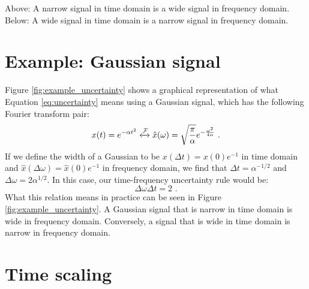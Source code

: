 \begin{marginfigure}
\begin{center}

\end{center}
\caption{Above: A narrow signal in time domain is a wide signal in frequency domain. 
Below: A wide signal in time domain is a narrow signal in frequency domain.}
\label{fig:example_uncertainty}
\end{marginfigure}

\section{Example: Gaussian signal}
Figure \ref{fig:example_uncertainty} shows a graphical representation
of what Equation \ref{eq:uncertainty} means using a Gaussian signal, which has the following Fourier transform pair:
\begin{equation}
x(t) = e^{-\alpha t^2} \xleftrightarrow{\mathcal{F}} \hat{x}(\omega) = \sqrt{\frac{\pi}{\alpha}} e^{-\frac{\omega^2}{4\alpha}} \,\,.
\end{equation}
If we define the width of a Gaussian to be $x(\Delta t)=x(0)e^{-1}$ in
time domain and $\hat{x}(\Delta \omega)=\hat{x}(0)e^{-1}$ in frequency
domain, we find that $\Delta t = \alpha^{-1/2}$ and $\Delta \omega
= 2\alpha^{1/2}$. In this case, our time-frequency uncertainty rule would be:
\begin{equation}
\Delta \omega \Delta t  = 2 \,\,.
\end{equation}
What this relation means in practice can be seen in
Figure \ref{fig:example_uncertainty}. A Gaussian signal that is narrow
in time domain is wide in frequency domain. Conversely, a signal that
is wide in time domain is narrow in frequency domain.


\section{Time scaling}

